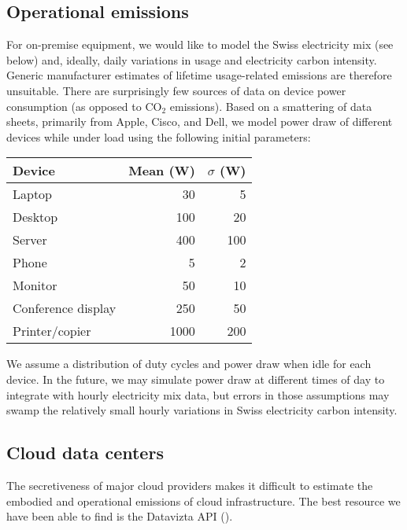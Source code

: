 \documentclass[11pt]{article}
\begin{document}
\subsection{Operational emissions}

For on-premise equipment, we would like to model the Swiss electricity mix (see below) and, ideally,
daily variations in usage and electricity carbon intensity.
Generic manufacturer estimates of lifetime usage-related emissions are therefore unsuitable.
There are surprisingly few sources of data on device power consumption (as opposed to CO$_2$ emissions).
Based on a smattering of data sheets, primarily from Apple, Cisco, and Dell, we model
power draw of different devices while under load using the following initial parameters:

\begin{center}
\begin{tabular}{|l|r|r|}
\hline
\textbf{Device} & \textbf{Mean (W)} & \textbf{$\sigma$ (W)} \\ \hline
Laptop & 30 & 5 \\ \hline
Desktop & 100 & 20 \\ \hline
Server & 400 & 100 \\ \hline
Phone & 5 & 2 \\ \hline
Monitor & 50 & 10 \\ \hline
Conference display & 250 & 50 \\ \hline
Printer/copier & 1000 & 200 \\ \hline
\end{tabular}
\end{center}

We assume a distribution of duty cycles and power draw when idle for each device.
In the future, we may simulate power draw at different times of day to integrate with
hourly electricity mix data, but errors in those assumptions may swamp the relatively small
hourly variations in Swiss electricity carbon intensity.

\subsection{Cloud data centers}
\label{sec:cloud_data_centers}

The secretiveness of major cloud providers makes it difficult to estimate the embodied and operational emissions of cloud
infrastructure. The best resource we have been able to find is the Datavizta API (\textcite{boavizta}).
\end{document}
